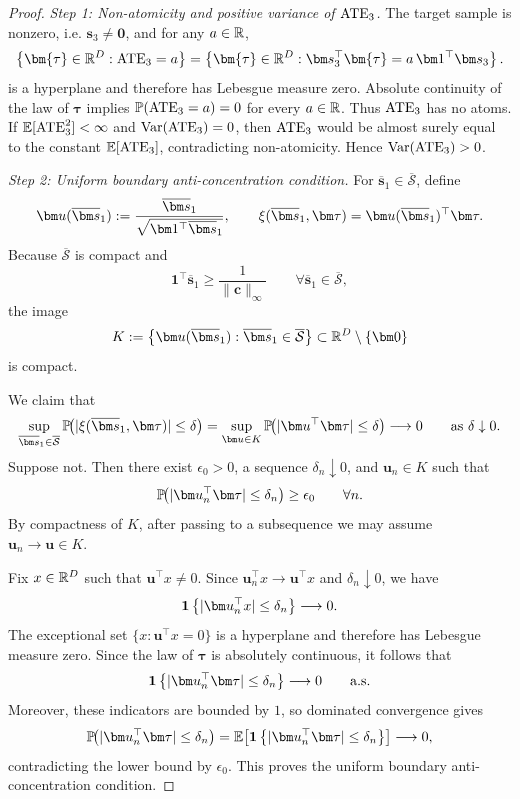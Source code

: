 \begin{proof}
  \emph{Step 1: Non-atomicity and positive variance of $\mathrm{ATE}_3$.}
  The target sample is nonzero, i.e. $\bm s_3\neq\bm0$, and for any $a\in\mathbb{R}$,
  \[
    \left\{\bm{\tau}\in\R^D:\ATE_3=a\right\}
    =
    \left\{\bm{\tau}\in\R^D:\bm s_3^\top \bm{\tau}=a\,\bm1^\top\bm s_3\right\}.
  \]
  is a hyperplane and therefore has Lebesgue measure zero.
  Absolute continuity of the law of $\bm\tau$ implies $\mathbb{P}(\mathrm{ATE}_3=a)=0$ for every $a\in\mathbb{R}$.
  Thus $\mathrm{ATE}_3$ has no atoms.
  If $\mathbb{E}[\mathrm{ATE}_3^2]<\infty$ and ${\rm Var}(\mathrm{ATE}_3)=0$, then $\mathrm{ATE}_3$ would be almost surely equal to the constant $\mathbb{E}[\mathrm{ATE}_3]$, contradicting non-atomicity.
  Hence ${\rm Var}(\mathrm{ATE}_3)>0$.

  \emph{Step 2: Uniform boundary anti-concentration condition.}
  For $\overline{\bm s}_1\in\overline{\mathcal{S}}$, define
  \[
    \bm u(\overline{\bm s}_1)
    \defeq
    \frac{\overline{\bm s}_1}{\sqrt{\bm 1^\top \overline{\bm s}_1}},
    \qquad
    \xi(\overline{\bm s}_1,\bm\tau)
    =
    \bm u(\overline{\bm s}_1)^\top \bm\tau.
  \]
  Because $\overline{\mathcal{S}}$ is compact and
  \[
    \bm 1^\top \overline{\bm s}_1
    \ge
    \frac{1}{\|\bm c\|_\infty}
    \qquad
    \forall \overline{\bm s}_1\in\overline{\mathcal{S}},
  \]
  the image
  \[
    K
    \defeq
    \bigl\{\bm u(\overline{\bm s}_1):\overline{\bm s}_1\in\overline{\mathcal{S}}\bigr\}
    \subset \R^D\setminus\{\bm 0\}
  \]
  is compact.

  We claim that
  \[
    \sup_{\overline{\bm s}_1\in\overline{\mathcal{S}}}
    \P\!\bigl(|\xi(\overline{\bm s}_1,\bm\tau)|\le \delta\bigr)
    =
    \sup_{\bm u\in K}\P\!\bigl(|\bm u^\top\bm\tau|\le \delta\bigr)
    \longrightarrow 0
    \qquad\text{as }\delta\downarrow 0.
  \]
  Suppose not.
  Then there exist $\epsilon_0>0$, a sequence $\delta_n\downarrow 0$, and $\bm u_n\in K$ such that
  \[
    \P\!\bigl(|\bm u_n^\top\bm\tau|\le \delta_n\bigr)\ge \epsilon_0
    \qquad
    \forall n.
  \]
  By compactness of $K$, after passing to a subsequence we may assume $\bm u_n\to \bm u\in K$.

  Fix $x\in\mathbb{R}^D$ such that $\bm u^\top x\neq 0$.
  Since $\bm u_n^\top x\to \bm u^\top x$ and $\delta_n\downarrow 0$, we have
  \[
    \indic{|\bm u_n^\top x|\le \delta_n}\longrightarrow 0.
  \]
  The exceptional set $\{x:\bm u^\top x=0\}$ is a hyperplane and therefore has Lebesgue measure zero.
  Since the law of $\bm\tau$ is absolutely continuous, it follows that
  \[
    \indic{|\bm u_n^\top\bm\tau|\le \delta_n}\longrightarrow 0
    \qquad\text{a.s.}
  \]
  Moreover, these indicators are bounded by $1$, so dominated convergence gives
  \[
    \P\!\bigl(|\bm u_n^\top\bm\tau|\le \delta_n\bigr)
    =
    \E\!\left[\indic{|\bm u_n^\top\bm\tau|\le \delta_n}\right]
    \longrightarrow 0,
  \]
  contradicting the lower bound by $\epsilon_0$.
  This proves the uniform boundary anti-concentration condition.


\end{proof}
